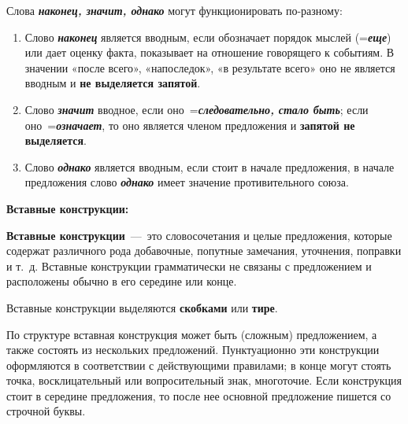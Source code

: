\documentclass[main]{subfile}
\begin{document}
Слова \textit{\textbf{наконец, значит, однако}} могут функционировать по-разному:

\begin{enumerate}
      \item Слово \textit{\textbf{наконец}} является вводным, если обозначает порядок мыслей (=\textit{\textbf{еще}}) или дает оценку факта, показывает на отношение говорящего к событиям.
            В значении «после всего», «напоследок», «в результате всего» оно не является вводным и \textbf{не выделяется запятой}. \newline
      \item Слово \textit{\textbf{значит}} вводное, если оно =\textit{\textbf{следовательно, стало быть}}; если оно =\textit{\textbf{означает}}, то оно является членом предложения и \textbf{запятой не выделяется}. \newline
      \item Слово \textit{\textbf{однако}} является вводным, если стоит в начале предложения, в начале предложения слово \textit{\textbf{однако}} имеет значение противительного союза.
\end{enumerate}

\textbf{Вставные конструкции:}

\textbf{Вставные конструкции} --- это словосочетания и целые предложения, которые содержат различного рода добавочные, попутные замечания, уточнения, поправки и т. д.
Вставные конструкции грамматически не связаны с предложением и расположены обычно в его середине или конце.

Вставные конструкции выделяются \textbf{скобками} или \textbf{тире}.

По структуре вставная конструкция может быть (сложным) предложением, а также состоять из нескольких предложений.
Пунктуационно эти конструкции оформляются в соответствии с действующими правилами; в конце могут стоять точка, восклицательный или вопросительный знак, многоточие.
Если конструкция стоит в середине предложения, то после нее основной предложение пишется со строчной буквы.

\end{document}
